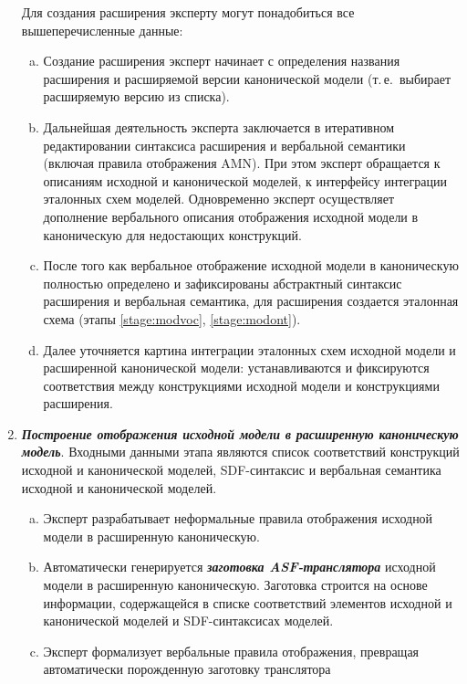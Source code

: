 \begin{multicols}{2}
\begin{enumerate}[1.]
Для создания расширения эксперту могут понадобиться все
вышеперечисленные данные:
\begin{enumerate}[(a)]
\item \label{stage:ext}
Создание расширения эксперт начинает с
определения названия расширения и расширяемой версии канонической
модели (т.\,е.\ выбирает расширяемую версию из списка).
\item \label{stage:extsyn}
Дальнейшая деятельность эксперта
заключается в итеративном редактировании синтаксиса
расширения и вербальной семантики (включая правила отображения AMN).
При этом эксперт обращается к описаниям исходной и канонической моделей, к
интерфейсу интеграции эталонных схем моделей. Одновременно эксперт
осуществляет дополнение вербального описания отображения исходной
модели в каноническую для не\-до\-ста\-ющих конструкций.
\item \label{stage:extont}
После того как вербальное отображение исходной модели в каноническую
полностью определено и зафиксированы абстрактный синтаксис расширения и
вербальная семантика, для расширения создается эталонная схема
(этапы \ref{stage:modvoc}, \ref{stage:modont}).
\item \label{stage:extontint}
Далее уточняется картина интеграции эталонных схем исходной модели и
расширенной канонической модели: уста\-нав\-ли\-ва\-ются и фиксируются соответствия
между %
конструкциями исходной модели и кон\-струк\-ци\-я\-ми расширения.
 \end{enumerate}
 \item {\bfseries\textit{Построение отображения исходной модели в расширенную
каноническую модель}}.
Входными данными этапа являются список соответствий конструкций
исходной и канонической моделей, SDF-синтаксис и вербальная семантика
исходной и канонической моделей.
\begin{enumerate}[(a)]
\item \label{stage:transverb}
Эксперт разрабатывает неформальные правила отображения
исходной модели в расширенную каноническую.
\item \label{stage:transtemp}
Автоматически генерируется {\bfseries\textit{заготовка ASF-транслятора}}
исходной модели в расширенную каноническую.
Заготовка строится на основе информации, содержащейся
в списке соответствий элементов исходной и канонической моделей
и SDF-синтаксисах моделей.
\item \label{stage:transasf}
Эксперт формализует вербальные правила отображения,
превращая автоматически порожденную заготовку транслятора

\end{enumerate}
\end{enumerate}
\end{multicols}

